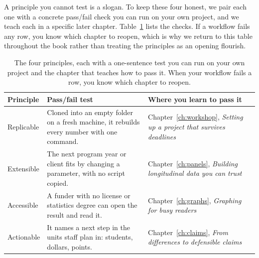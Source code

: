 A principle you cannot test is a slogan. To keep these four honest, we pair each one with a concrete pass\slash fail check you can run on your own project, and we teach each in a specific later chapter. Table~\ref{tab:principles} lists the checks. If a workflow fails any row, you know which chapter to reopen, which is why we return to this table throughout the book rather than treating the principles as an opening flourish.

\begin{table}[htbp]
\centering
\footnotesize
\caption[The four principles, with pass/fail tests]{The four principles, each with a one-sentence test you can run on your own project and the chapter that teaches how to pass it. When your workflow fails a row, you know which chapter to reopen.}
\label{tab:principles}
\begin{tabular}{@{}p{2.0cm}p{8.4cm}p{4.6cm}@{}}
\hline
\textbf{Principle} & \textbf{Pass/fail test} & \textbf{Where you learn to pass it} \\
\hline
Replicable & Cloned into an empty folder on a fresh machine, it rebuilds every number with one command. & Chapter~\ref{ch:workshop}, \emph{Setting up a project that survives deadlines} \\
Extensible & The next program year or client fits by changing a parameter, with no script copied. & Chapter~\ref{ch:panels}, \emph{Building longitudinal data you can trust} \\
Accessible & A funder with no license or statistics degree can open the result and read it. & Chapter~\ref{ch:graphs}, \emph{Graphing for busy readers} \\
Actionable & It names a next step in the units staff plan in: students, dollars, points. & Chapter~\ref{ch:claims}, \emph{From differences to defensible claims} \\
\hline
\end{tabular}
\end{table}

